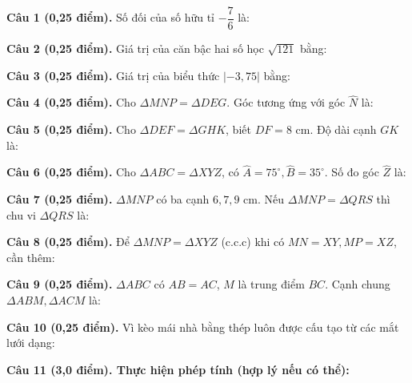 \documentclass[12pt,a4paper]{article}
\begin{document}
\vspace{1.5mm}
\noindent\textbf{Câu 1 (0,25 điểm).} Số đối của số hữu tỉ $-\dfrac{7}{6}$ là: \par\vspace{2.3mm}
\noindent\textbf{Câu 2 (0,25 điểm).} Giá trị của căn bậc hai số học $\sqrt{121}$ bằng: \par\vspace{2.3mm}
\noindent\textbf{Câu 3 (0,25 điểm).} Giá trị của biểu thức $|-3{,}75|$ bằng: \par\vspace{2.3mm}
\noindent\textbf{Câu 4 (0,25 điểm).} Cho $\Delta MNP = \Delta DEG$. Góc tương ứng với góc $\widehat{N}$ là: \par\vspace{2.3mm}
\noindent\textbf{Câu 5 (0,25 điểm).} Cho $\Delta DEF = \Delta GHK$, biết $DF = 8\text{ cm}$. Độ dài cạnh $GK$ là: \par\vspace{2.3mm}
\noindent\textbf{Câu 6 (0,25 điểm).} Cho $\Delta ABC = \Delta XYZ$, có $\widehat{A} = 75^\circ, \widehat{B} = 35^\circ$. Số đo góc $\widehat{Z}$ là: \par\vspace{2.3mm}
\noindent\textbf{Câu 7 (0,25 điểm).} $\Delta MNP$ có ba cạnh $6, 7, 9\text{ cm}$. Nếu $\Delta MNP = \Delta QRS$ thì chu vi $\Delta QRS$ là: \par\vspace{2.3mm}
\noindent\textbf{Câu 8 (0,25 điểm).} Để $\Delta MNP = \Delta XYZ$ (c.c.c) khi có $MN=XY, MP=XZ$, cần thêm: \par\vspace{2.3mm}
\noindent\textbf{Câu 9 (0,25 điểm).} $\Delta ABC$ có $AB=AC$, $M$ là trung điểm $BC$. Cạnh chung $\Delta ABM, \Delta ACM$ là: \par\vspace{2.3mm}
\noindent\textbf{Câu 10 (0,25 điểm).} Vì kèo mái nhà bằng thép luôn được cấu tạo từ các mắt lưới dạng: \par\vspace{2.3mm}
\vspace{0.2mm}
\noindent\textbf{Câu 11 (3,0 điểm). Thực hiện phép tính (hợp lý nếu có thể):}
\vspace{0.8mm}
\end{document}
